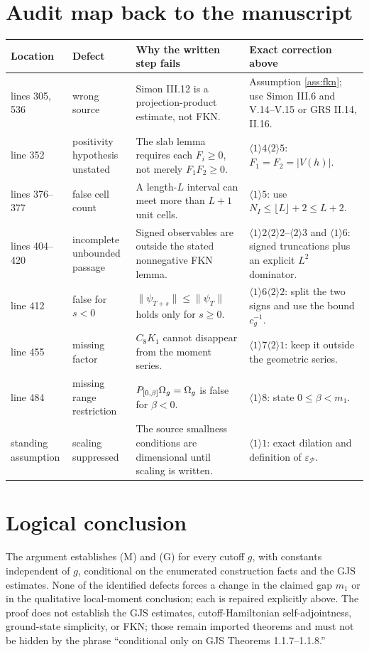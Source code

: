\documentclass[11pt,a4paper]{article}
\begin{document}
\QedStep

\section{Audit map back to the manuscript}

\begin{longtable}{P{1.8cm}P{3.0cm}P{4.5cm}P{5.0cm}}
\toprule
Location & Defect & Why the written step fails & Exact correction above\\
\midrule
\endhead
lines 305, 536 & wrong source & Simon III.12 is a projection-product estimate, not FKN. &
Assumption \ref{ass:fkn}; use Simon III.6 and V.14--V.15 or GRS II.14, II.16.\\
line 352 & positivity hypothesis unstated & The slab lemma requires each $F_i\geq0$, not merely $F_1F_2\geq0$. &
$\langle1\rangle4\langle2\rangle5$: $F_1=F_2=|V(h)|$.\\
lines 376--377 & false cell count & A length-$L$ interval can meet more than $L+1$ unit cells. &
$\langle1\rangle5$: use $N_I\leq\lfloor L\rfloor+2\leq L+2$.\\
lines 404--420 & incomplete unbounded passage & Signed observables are outside the stated nonnegative FKN lemma. &
$\langle1\rangle2\langle2\rangle2$--$\langle2\rangle3$ and
$\langle1\rangle6$: signed truncations plus an explicit $L^2$ dominator.\\
line 412 & false for $s<0$ & $\|\psi_{T+s}\|\leq\|\psi_T\|$ holds only for $s\geq0$. &
$\langle1\rangle6\langle2\rangle2$: split the two signs and use the bound $c_g^{-1}$.\\
line 455 & missing factor & $C_8K_1$ cannot disappear from the moment series. &
$\langle1\rangle7\langle2\rangle1$: keep it outside the geometric series.\\
line 484 & missing range restriction & $P_{[0,\beta]}\Omega_g=\Omega_g$ is false for $\beta<0$. &
$\langle1\rangle8$: state $0\leq\beta<m_1$.\\
standing assumption & scaling suppressed & The source smallness conditions are dimensional until scaling is written. &
$\langle1\rangle1$: exact dilation and definition of $\varepsilon_{\mathscr P}$.\\
\bottomrule
\end{longtable}

\section{Logical conclusion}

The argument establishes (M) and (G) for every cutoff $g$, with constants independent
of $g$, conditional on the enumerated construction facts and the GJS estimates.  None of
the identified defects forces a change in the claimed gap $m_1$ or in the qualitative
local-moment conclusion; each is repaired explicitly above.  The proof does not establish
the GJS estimates, cutoff-Hamiltonian self-adjointness, ground-state simplicity, or FKN;
those remain imported theorems and must not be hidden by the phrase ``conditional only on
GJS Theorems 1.1.7--1.1.8.''
\end{document}
